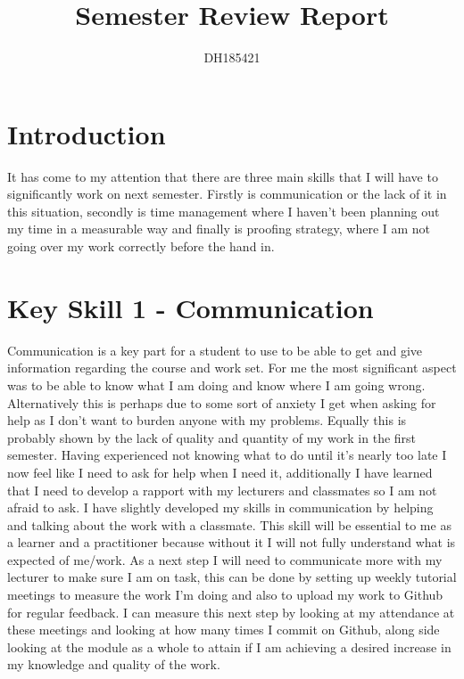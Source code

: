 \documentclass{scrartcl}
\title{Semester Review Report}
\author{DH185421}
\begin{document}
\maketitle


\section{Introduction}
It has come to my attention that there are three main skills that I will have to significantly work on next semester. Firstly is communication or the lack of it in this situation, secondly is time management where I haven't been planning out my time in a measurable way and finally is proofing strategy, where I am not going over my work correctly before the hand in.



\section{Key Skill 1 - Communication}

Communication is a key part for a student to use to be able to get and give information regarding the course and work set. For me the most significant aspect was to be able to know what I am doing and know where I am going wrong. Alternatively this is perhaps due to some sort of anxiety I get when asking for help as I don’t want to burden anyone with my problems. Equally this is probably shown by the lack of quality and quantity of my work in the first semester. Having experienced not knowing what to do until it's nearly too late I now feel like I need to ask for help when I need it, additionally I have learned that I need to develop a rapport with my lecturers and classmates so I am not afraid to ask. I have slightly developed my skills in communication by helping and talking about the work with a classmate. This skill will be essential to me as a learner and a practitioner because without it I will not fully understand what is expected of me/work. As a next step I will need to communicate more with my lecturer to make sure I am on task, this can be done by setting up weekly tutorial meetings to measure the work I'm doing and also to upload my work to Github for regular feedback. I can measure this next step by looking at my attendance at these meetings and looking at how many times I commit on Github, along side looking at the module as a whole to attain if I am achieving a desired increase in my knowledge and quality of the work.
\end{document}
